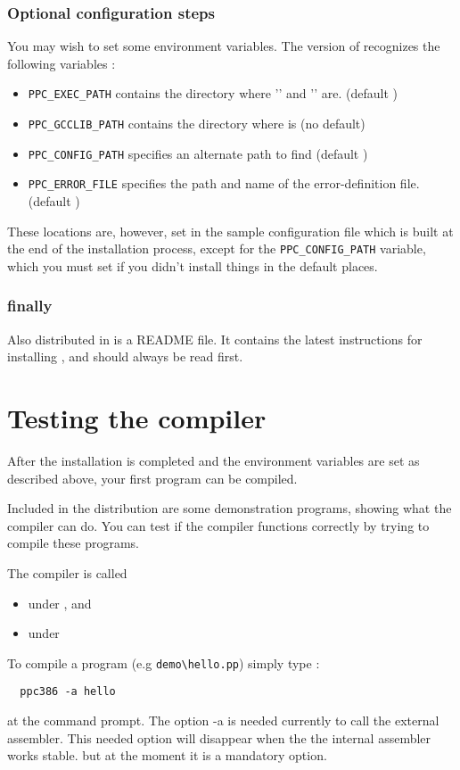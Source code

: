\documentclass{report}
\begin{document}
\subsubsection{Optional configuration steps}
You may wish to set some environment variables. The \linux version of \fpk
recognizes the following variables :
\begin{itemize}
\item \verb|PPC_EXEC_PATH| contains the directory where '' and
'' are. (default )
\item \verb|PPC_GCCLIB_PATH| contains the directory where  is (no default)
\item \verb|PPC_CONFIG_PATH| specifies an alternate path to find
 (default )
\item \verb|PPC_ERROR_FILE|  specifies the path and name of the error-definition file. 
                  (default )
\end{itemize}

These locations are, however, set in the sample configuration file which is 
built at the end of the installation process, except for the
\verb|PPC_CONFIG_PATH| variable, which you must set if you didn't install
things in the default places.
\subsubsection{finally}
Also distributed in \fpk is a README file. It contains the latest
instructions for installing \fpk, and should always be read first.


\section{Testing the compiler}
After the installation is completed and the environment variables are
set as described above, your first program can be compiled. 

Included in the \fpk distribution are some demonstration programs, 
showing what the compiler can do. 
You can test if the compiler functions correctly by trying to compile 
these programs.

The compiler is called
\begin{itemize}
\item {} under \dos, and 
\item {} under \linux
\end{itemize}
To compile a program (e.g \verb|demo\hello.pp|) simply type :
\begin{verbatim}
  ppc386 -a hello
\end{verbatim}
at the command prompt. The option -a is needed currently to call 
the external assembler. 
This needed option will disappear when the the internal assembler works stable.
but at the moment it is a mandatory option.
\end{document}
